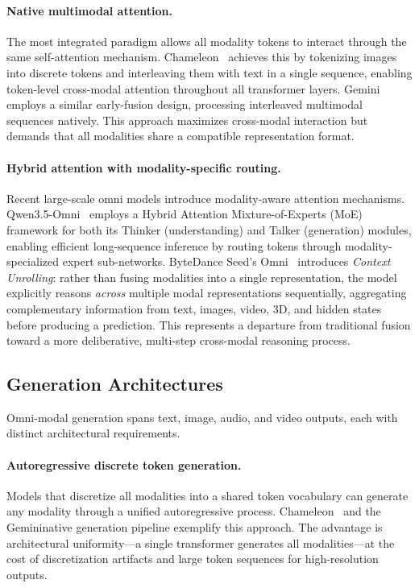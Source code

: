 \documentclass{article}
\begin{document}
\paragraph{Native multimodal attention.}
The most integrated paradigm allows all modality tokens to interact through the same self-attention mechanism.
Chameleon~\cite{jiang2024chameleon} achieves this by tokenizing images into discrete tokens and interleaving them with text in a single sequence, enabling token-level cross-modal attention throughout all transformer layers.
Gemini~\cite{google2024gemini} employs a similar early-fusion design, processing interleaved multimodal sequences natively.
This approach maximizes cross-modal interaction but demands that all modalities share a compatible representation format.

\paragraph{Hybrid attention with modality-specific routing.}
Recent large-scale omni models introduce modality-aware attention mechanisms.
Qwen3.5-Omni~\cite{qwen2026omni} employs a Hybrid Attention Mixture-of-Experts (MoE) framework for both its Thinker (understanding) and Talker (generation) modules, enabling efficient long-sequence inference by routing tokens through modality-specialized expert sub-networks.
ByteDance Seed's Omni~\cite{seed2026omni} introduces \emph{Context Unrolling}: rather than fusing modalities into a single representation, the model explicitly reasons \emph{across} multiple modal representations sequentially, aggregating complementary information from text, images, video, 3D, and hidden states before producing a prediction.
This represents a departure from traditional fusion toward a more deliberative, multi-step cross-modal reasoning process.

\subsection{Generation Architectures}

Omni-modal generation spans text, image, audio, and video outputs, each with distinct architectural requirements.

\paragraph{Autoregressive discrete token generation.}
Models that discretize all modalities into a shared token vocabulary can generate any modality through a unified autoregressive process.
Chameleon~\cite{jiang2024chameleon} and the Gemininative generation pipeline exemplify this approach.
The advantage is architectural uniformity---a single transformer generates all modalities---at the cost of discretization artifacts and large token sequences for high-resolution outputs.
\end{document}
